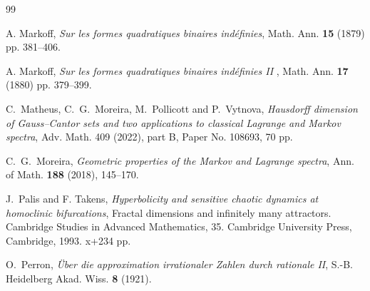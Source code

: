 \documentclass[10pt]{amsart}
\numberwithin{equation}{section}
\theoremstyle{definition}
\begin{document}
\begin{thebibliography}{99}

  A. Markoff, \emph{Sur les formes quadratiques binaires ind\'efinies}, Math. Ann.
\textbf{15} (1879) pp. 381--406.

 A. Markoff, \emph{Sur les formes quadratiques binaires
    ind\'efinies II} , Math. Ann. \textbf{17} (1880) pp. 379--399. 


 C.~Matheus, C.~G.~Moreira, M.~Pollicott and P.~Vytnova,
    \emph{Hausdorff dimension of Gauss--Cantor sets and two applications to
    classical Lagrange and Markov spectra},  Adv. Math. 409 (2022), part B,
    Paper No. 108693, 70 pp.


 C.~G.~Moreira, \emph{Geometric properties of the Markov and
    Lagrange spectra},  Ann. of Math. \textbf{188} (2018), 145--170. 



 J.~Palis and F. Takens, \emph{Hyperbolicity and sensitive chaotic
    dynamics at homoclinic bifurcations}, 
Fractal dimensions and infinitely many attractors. Cambridge Studies in Advanced
Mathematics, 35. Cambridge University Press, Cambridge, 1993. x+234 pp. 

 O.~Perron, \emph{\"Uber die approximation irrationaler Zahlen
    durch rationale II}, S.-B. Heidelberg Akad. Wiss. \textbf{8} (1921). 


\end{thebibliography}
\end{document}
